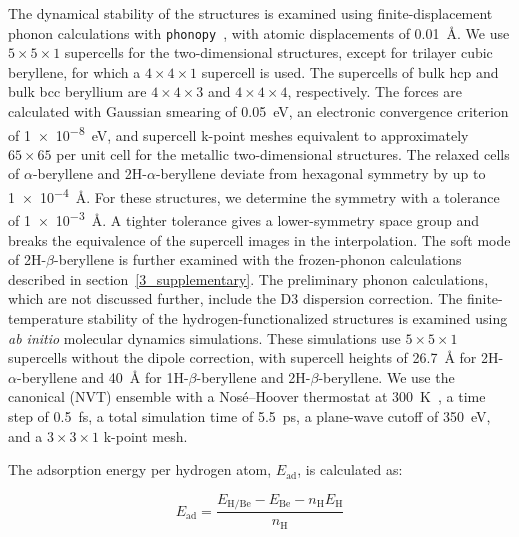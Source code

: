 The dynamical stability of the structures is examined using finite-displacement phonon calculations with \texttt{phonopy}~\cite{togo2015first,togo2023implementation},
with atomic displacements of \qty{0.01}{\angstrom}.
We use $5 \times 5 \times 1$ supercells for the two-dimensional structures,
except for trilayer cubic beryllene,
for which a $4 \times 4 \times 1$ supercell is used.
The supercells of bulk hcp and bulk bcc beryllium are $4 \times 4 \times 3$ and $4 \times 4 \times 4$,
respectively.
The forces are calculated with Gaussian smearing of \qty{0.05}{\electronvolt},
an electronic convergence criterion of \qty{1e-8}{\electronvolt},
and supercell k-point meshes equivalent to approximately $65 \times 65$ per unit cell for the metallic two-dimensional structures.
The relaxed cells of $\alpha$-beryllene and 2H-$\alpha$-beryllene deviate from hexagonal symmetry by up to \qty{1e-4}{\angstrom}.
For these structures,
we determine the symmetry with a tolerance of \qty{1e-3}{\angstrom}.
A tighter tolerance gives a lower-symmetry space group and breaks the equivalence of the supercell images in the interpolation.
The soft mode of 2H-$\beta$-beryllene is further examined with the frozen-phonon calculations described in section~\ref{3_supplementary}.
The preliminary phonon calculations,
which are not discussed further,
include the D3 dispersion correction.
The finite-temperature stability of the hydrogen-functionalized structures is examined using \textit{ab initio} molecular dynamics simulations.
These simulations use $5 \times 5 \times 1$ supercells without the dipole correction,
with supercell heights of \qty{26.7}{\angstrom} for 2H-$\alpha$-beryllene and \qty{40}{\angstrom} for 1H-$\beta$-beryllene and 2H-$\beta$-beryllene.
We use the canonical (NVT) ensemble with a Nos\'e--Hoover thermostat at \qty{300}{\kelvin}~\cite{nose1984unified,hoover1985canonical},
a time step of \qty{0.5}{\femto\second},
a total simulation time of \qty{5.5}{\pico\second},
a plane-wave cutoff of \qty{350}{\electronvolt},
and a $3 \times 3 \times 1$ k-point mesh.

The adsorption energy per hydrogen atom,
$E_{\mathrm{ad}}$,
is calculated as:

\begin{equation}
    E_{\mathrm{ad}} =
    \frac{E_{\mathrm{H/Be}}-E_{\mathrm{Be}}-n_{\mathrm{H}}E_{\mathrm{H}}}{n_{\mathrm{H}}}
\label{eq:proj3_hydrogen_adsorption_energy}
\end{equation}

